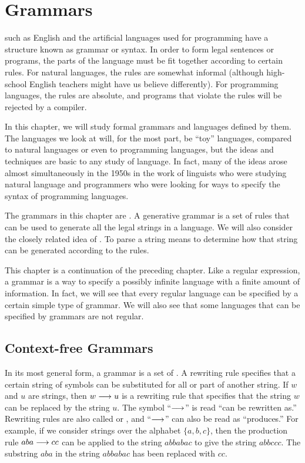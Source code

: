 
\chapter{Grammars}\label{C-grammars}


such as English and the
artificial languages used for programming have a structure
known as grammar or syntax.  In order to form legal sentences
or programs, the parts of the language must be fit together
according to certain rules.  For natural languages, the
rules are somewhat informal (although high-school English
teachers might have us believe differently).  For programming
languages, the rules are absolute, and programs that violate
the rules will be rejected by a compiler.

In this chapter, we will study formal grammars and languages
defined by them.  The languages we look at will, for the most part,
be ``toy'' languages, compared to natural languages or even
to programming languages, but the ideas and techniques are basic
to any study of language.  In fact, many of the ideas arose
almost simultaneously in the 1950s in the work of linguists who were
studying natural language and programmers who were looking for
ways to specify the syntax of programming languages.

The grammars in this chapter are .
A generative grammar is a set of rules that can be used to generate
all the legal strings in a language.  We will also consider the closely
related idea of .  To parse a string means to determine
how that string can be generated according to the rules.

This chapter is a continuation of the preceding chapter.  
Like a regular expression, a grammar is a way to specify a possibly
infinite language with a finite amount of information.  In fact,
we will see that every regular language can be specified
by a certain simple type of grammar.  We will also see that some languages
that can be specified by grammars are not regular.

\section{Context-free Grammars}\label{S-grammars-1}

In its most general form, a grammar is a set of .  A rewriting rule specifies that a certain string of symbols can
be substituted for all or part of another string.  If $w$ and $u$ are
strings, then $w\longrightarrow u$ is a rewriting rule that specifies that
the string $w$ can be replaced by the string $u$.  The symbol ``$\longrightarrow$''
is read ``can be rewritten as.''  Rewriting rules are also called
 or , and
``$\longrightarrow$'' can also be read as ``produces.''  For example,
if we consider strings over the alphabet $\{a,b,c\}$, then
the production rule $aba\longrightarrow cc$ can be applied to the
string $abbabac$ to give the string $abbccc$.  The substring $aba$
in the string $abbabac$ has been replaced with $cc$.

